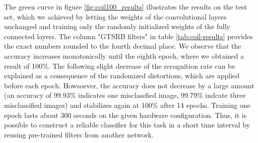 \documentclass[11pt, a4paper]{article}
\begin{document}
The green curve in figure \ref{fig:coil100_results} illustrates the results on the test set, which we achieved by letting the weights of the convolutional layers unchanged and training only the randomly initialized weights of the fully connected layers. The column "GTSRB filters" in table \ref{tab:coil-results} provides the exact numbers rounded to the fourth decimal place. We observe that the accuracy increases monotonically until the eighth epoch, where we obtained a result of 100\%. The following slight decrease of the recognition rate can be explained as a consequence of the randomized distortions, which are applied before each epoch. Howsoever, the accuracy does not decrease by a large amount (an accuracy of 99.93\% indicates one misclassfied image, 99.79\% indcate three misclassified images) and stabilizes again at 100\% after 14 epochs. Training one epoch lasts about 300 seconds on the given hardware configuration. Thus, it is possible to construct a reliable classifier for this task in a short time interval by reusing pre-trained filters from another network.%
\end{document}

